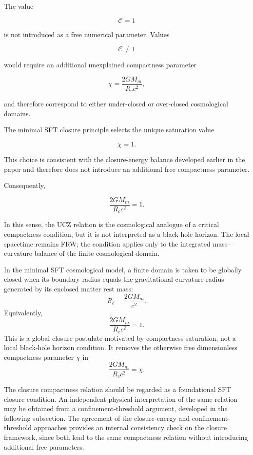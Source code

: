 \documentclass[12pt]{article}
\begin{document}
The value

\[
\mathcal C =1
\]

is not introduced as a free numerical parameter. Values

\[
\mathcal C \neq 1
\]

would require an additional unexplained compactness parameter

\[
\chi
=
\frac{2GM_m}{R_c c^2},
\]

and therefore correspond to either under-closed or over-closed
cosmological domains.

The minimal SFT closure principle selects the unique saturation value

\[
\boxed{\chi=1.}
\]

This choice is consistent with the closure-energy balance developed
earlier in the paper and therefore does not introduce an additional
free compactness parameter.

Consequently,

\[
\frac{2GM_m}{R_c c^2}=1.
\]

In this sense, the UCZ relation is the cosmological analogue of a critical
compactness condition, but it is not interpreted as a black-hole horizon.
The local spacetime remains FRW; the condition applies only to the integrated
mass--curvature balance of the finite cosmological domain.


\begin{tcolorbox}[colback=white!96!blue!2, colframe=black,
title=\textbf{UCZ Minimal Closure Postulate}]
In the minimal SFT cosmological model, a finite domain is taken to be
globally closed when its boundary radius equals the gravitational curvature
radius generated by its enclosed matter rest mass:
\[
R_c=\frac{2GM_m}{c^2}.
\]
Equivalently,
\[
\frac{2GM_m}{R_c c^2}=1.
\]
This is a global closure postulate motivated by compactness saturation,
not a local black-hole horizon condition. It removes the otherwise free
dimensionless compactness parameter $\chi$ in
\[
\frac{2GM_m}{R_c c^2}=\chi.
\]
\end{tcolorbox}

The closure compactness relation should be regarded as a foundational
SFT closure condition. An independent physical interpretation of the
same relation may be obtained from a confinement-threshold argument,
developed in the following subsection. The agreement of the closure-energy and confinement-threshold
approaches provides an internal consistency check on the closure
framework, since both lead to the same compactness relation without
introducing additional free parameters.
\end{document}
